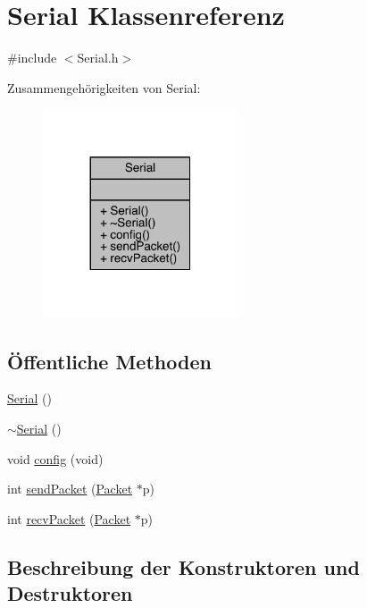 \hypertarget{class_serial}{}\section{Serial Klassenreferenz}
\label{class_serial}


{\ttfamily \#include $<$Serial.\+h$>$}



Zusammengehörigkeiten von Serial\+:
\nopagebreak
\begin{figure}[H]
\begin{center}
\leavevmode
\includegraphics[width=164pt]{class_serial__coll__graph}
\end{center}
\end{figure}
\subsection*{Öffentliche Methoden}
\begin{DoxyCompactItemize}
\item 
\hyperlink{class_serial_a3667c3137f2df94716b5193f9fb736ab}{Serial} ()
\item 
\hyperlink{class_serial_a5b32c394c0ff923a4ef1c13cfb20a6ba}{$\sim$\+Serial} ()
\item 
void \hyperlink{class_serial_a50aa90466c7c87af0178cfd496da36be}{config} (void)
\item 
int \hyperlink{class_serial_a18fe9cf8fc366e6691b6ddf5e9b473a1}{send\+Packet} (\hyperlink{struct_packet}{Packet} $\ast$p)
\item 
int \hyperlink{class_serial_a357fce40e93f5a3700bfec09defd0bf9}{recv\+Packet} (\hyperlink{struct_packet}{Packet} $\ast$p)
\end{DoxyCompactItemize}


\subsection{Beschreibung der Konstruktoren und Destruktoren}
\hypertarget{class_serial_a3667c3137f2df94716b5193f9fb736ab}{}\label{class_serial_a3667c3137f2df94716b5193f9fb736ab} 
